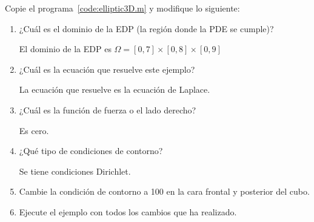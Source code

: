 \begin{problem}
Copie el programa~\ref{code:elliptic3D.m} y modifique lo siguiente:

\begin{enumerate}
      \item

            ¿Cuál es el dominio de la EDP (la región donde la PDE se cumple)?

            \begin{solution}
                  El dominio de la EDP es
                  \begin{math}
                        \Omega=
                        \left[
                              0,7
                              \right]\times
                        \left[
                              0,8
                              \right]\times
                        \left[
                              0,9
                              \right]
                  \end{math}
            \end{solution}

      \item

            ¿Cuál es la ecuación que resuelve este ejemplo?

            \begin{solution}
                  La ecuación que resuelve es la ecuación de Laplace.
            \end{solution}

      \item

            ¿Cuál es la función de fuerza o el lado derecho?

            \begin{solution}
                  Es cero.
            \end{solution}

      \item

            ¿Qué tipo de condiciones de contorno?

            \begin{solution}
                  Se tiene condiciones Dirichlet.
            \end{solution}

      \item

            Cambie la condición de contorno a 100 en la cara frontal y posterior del cubo.

            \begin{solution}
            \end{solution}

      \item

            Ejecute el ejemplo con todos los cambios que ha realizado.

            \begin{solution}
            \end{solution}
\end{enumerate}
\end{problem}


